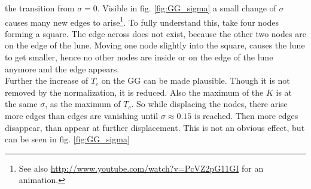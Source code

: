     the transition from \(\sigma = 0\). Visible in fig. \ref{fig:GG_sigma}
    a small change of \(\sigma\) causes many new edges to arise\footnote{See also \url{http://www.youtube.com/watch?v=PcVZ2pG11GI} for an animation.}.
    To fully understand this, take four nodes forming a square. The edge
    across does not exist, because the other two nodes are on the edge
    of the lune. Moving one node slightly into the square, causes the lune
    to get smaller, hence no other nodes are inside or on the edge of
    the lune anymore and the edge appears.\\
    Further the increase of \(T_c\) on the GG can be made plausible.
    Though it is not removed by the normalization, it is reduced. Also
    the maximum of the \(K\) is at the same \(\sigma\), as the maximum
    of \(T_c\). So while displacing the nodes, there arise more edges
    than edges are vanishing until \(\sigma \approx 0.15\) is reached.
    Then more edges disappear, than appear at further displacement. This
    is not an obvious effect, but can be seen in fig. \ref{fig:GG_sigma}
